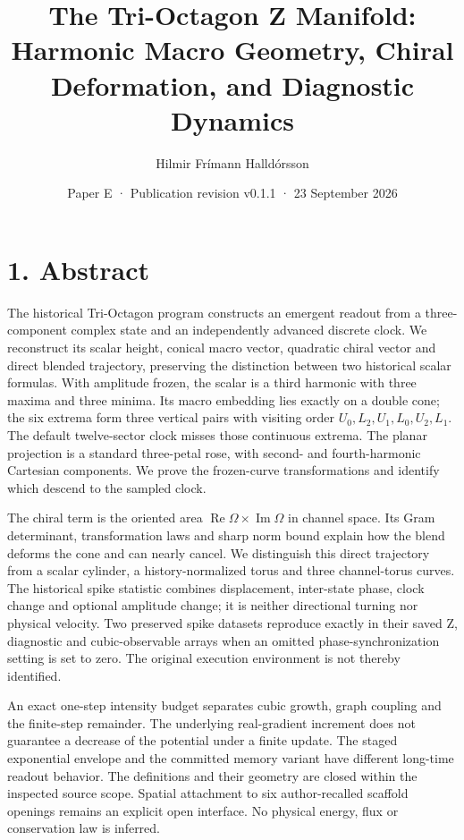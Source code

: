 \documentclass[
  11pt,
  a4paper,
]{article}
\title{The Tri-Octagon Z Manifold: Harmonic Macro Geometry, Chiral Deformation, and Diagnostic Dynamics}
\author{Hilmir Frímann Halldórsson}
\date{Paper E · Publication revision v0.1.1 · 23 September 2026}
\begin{document}
\maketitle

\section{1. Abstract}\label{abstract}

The historical Tri-Octagon program constructs an emergent readout from a three-component complex state and an independently advanced discrete clock. We reconstruct its scalar height, conical macro vector, quadratic chiral vector and direct blended trajectory, preserving the distinction between two historical scalar formulas. With amplitude frozen, the scalar is a third harmonic with three maxima and three minima. Its macro embedding lies exactly on a double cone; the six extrema form three vertical pairs with visiting order \(U_0,L_2,U_1,L_0,U_2,L_1\). The default twelve-sector clock misses those continuous extrema. The planar projection is a standard three-petal rose, with second- and fourth-harmonic Cartesian components. We prove the frozen-curve transformations and identify which descend to the sampled clock.

The chiral term is the oriented area \(\operatorname{Re}\Omega\times\operatorname{Im}\Omega\) in channel space. Its Gram determinant, transformation laws and sharp norm bound explain how the blend deforms the cone and can nearly cancel. We distinguish this direct trajectory from a scalar cylinder, a history-normalized torus and three channel-torus curves. The historical spike statistic combines displacement, inter-state phase, clock change and optional amplitude change; it is neither directional turning nor physical velocity. Two preserved spike datasets reproduce exactly in their saved Z, diagnostic and cubic-observable arrays when an omitted phase-synchronization setting is set to zero. The original execution environment is not thereby identified.

An exact one-step intensity budget separates cubic growth, graph coupling and the finite-step remainder. The underlying real-gradient increment does not guarantee a decrease of the potential under a finite update. The staged exponential envelope and the committed memory variant have different long-time readout behavior. The definitions and their geometry are closed within the inspected source scope. Spatial attachment to six author-recalled scaffold openings remains an explicit open interface. No physical energy, flux or conservation law is inferred.
\end{document}
